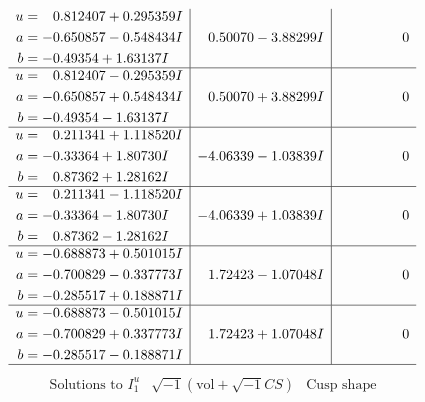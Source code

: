 \documentclass[1p]{elsarticle_modified}
\theoremstyle{definition}
\newcommand{\I}{\sqrt{-1}}
\begin{document}
$$\begin{array}{c|c|c}
\begin{aligned}
u &= \phantom{-}0.812407 + 0.295359 I \\
a &= -0.650857 - 0.548434 I \\
b &= -0.49354 + 1.63137 I\end{aligned}
 & \phantom{-}0.50070 - 3.88299 I & \phantom{-0.000000 } 0 \\ \hline\begin{aligned}
u &= \phantom{-}0.812407 - 0.295359 I \\
a &= -0.650857 + 0.548434 I \\
b &= -0.49354 - 1.63137 I\end{aligned}
 & \phantom{-}0.50070 + 3.88299 I & \phantom{-0.000000 } 0 \\ \hline\begin{aligned}
u &= \phantom{-}0.211341 + 1.118520 I \\
a &= -0.33364 + 1.80730 I \\
b &= \phantom{-}0.87362 + 1.28162 I\end{aligned}
 & -4.06339 - 1.03839 I & \phantom{-0.000000 } 0 \\ \hline\begin{aligned}
u &= \phantom{-}0.211341 - 1.118520 I \\
a &= -0.33364 - 1.80730 I \\
b &= \phantom{-}0.87362 - 1.28162 I\end{aligned}
 & -4.06339 + 1.03839 I & \phantom{-0.000000 } 0 \\ \hline\begin{aligned}
u &= -0.688873 + 0.501015 I \\
a &= -0.700829 - 0.337773 I \\
b &= -0.285517 + 0.188871 I\end{aligned}
 & \phantom{-}1.72423 - 1.07048 I & \phantom{-0.000000 } 0 \\ \hline\begin{aligned}
u &= -0.688873 - 0.501015 I \\
a &= -0.700829 + 0.337773 I \\
b &= -0.285517 - 0.188871 I\end{aligned}
 & \phantom{-}1.72423 + 1.07048 I & \phantom{-0.000000 } 0\\
 \hline 
 \end{array}$$\newpage$$\begin{array}{c|c|c}  
\text{Solutions to }I^u_{1}& \I (\text{vol} + \sqrt{-1}CS) & \text{Cusp shape}\\
 \hline 
\begin{aligned}

\end{aligned}
\end{array}$$
\end{document}
